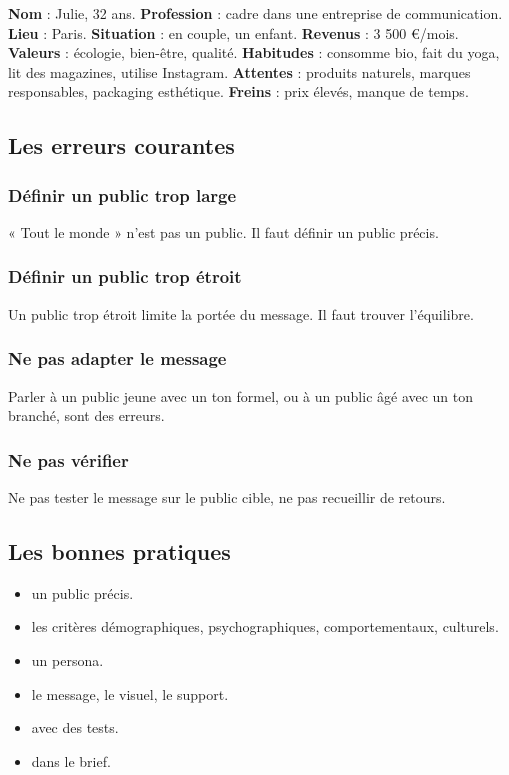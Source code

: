 \textbf{Nom} : Julie, 32 ans.
\textbf{Profession} : cadre dans une entreprise de communication.
\textbf{Lieu} : Paris.
\textbf{Situation} : en couple, un enfant.
\textbf{Revenus} : 3 500 €/mois.
\textbf{Valeurs} : écologie, bien-être, qualité.
\textbf{Habitudes} : consomme bio, fait du yoga, lit des magazines, utilise Instagram.
\textbf{Attentes} : produits naturels, marques responsables, packaging esthétique.
\textbf{Freins} : prix élevés, manque de temps.

\subsection{Les erreurs courantes}

\subsubsection{Définir un public trop large}

« Tout le monde » n'est pas un public. Il faut définir un public précis.

\subsubsection{Définir un public trop étroit}

Un public trop étroit limite la portée du message. Il faut trouver l'équilibre.

\subsubsection{Ne pas adapter le message}

Parler à un public jeune avec un ton formel, ou à un public âgé avec un ton branché, sont des erreurs.

\subsubsection{Ne pas vérifier}

Ne pas tester le message sur le public cible, ne pas recueillir de retours.

\subsection{Les bonnes pratiques}

\begin{itemize}
    \item {} un public précis.
    \item {} les critères démographiques, psychographiques, comportementaux, culturels.
    \item {} un persona.
    \item {} le message, le visuel, le support.
    \item {} avec des tests.
    \item {} dans le brief.
\end{itemize}

